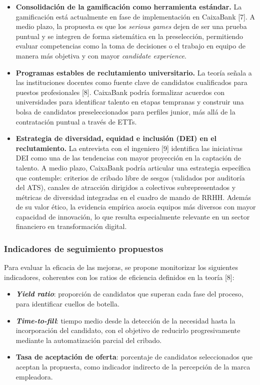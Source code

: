 \begin{itemize}
  \item \textbf{Consolidación de la gamificación como herramienta estándar.}
        La gamificación está actualmente en fase de implementación en CaixaBank [7].
        A medio plazo, la propuesta es que los \textit{serious games} dejen de ser
        una prueba puntual y se integren de forma sistemática en la preselección,
        permitiendo evaluar competencias como la toma de decisiones o el trabajo en
        equipo de manera más objetiva y con mayor \textit{candidate experience}.

  \item \textbf{Programas estables de reclutamiento universitario.}
        La teoría señala a las instituciones docentes como fuente clave de candidatos
        cualificados para puestos profesionales [8]. CaixaBank podría formalizar
        acuerdos con universidades para identificar talento en etapas tempranas y
        construir una bolsa de candidatos preseleccionados para perfiles junior, más
        allá de la contratación puntual a través de ETTs.

  \item \textbf{Estrategia de diversidad, equidad e inclusión (DEI) en el
        reclutamiento.} La entrevista con el ingeniero [9] identifica las iniciativas DEI
        como una de las tendencias con mayor proyección en la captación de talento.
        A medio plazo, CaixaBank podría articular una estrategia específica que
        contemple: criterios de cribado libre de sesgos (validados por auditoría del
        ATS), canales de atracción dirigidos a colectivos subrepresentados y métricas
        de diversidad integradas en el cuadro de mando de RRHH. Además de su valor
        ético, la evidencia empírica asocia equipos más diversos con mayor capacidad
        de innovación, lo que resulta especialmente relevante en un sector financiero
        en transformación digital.
\end{itemize}

\subsubsection{Indicadores de seguimiento propuestos}

Para evaluar la eficacia de las mejoras, se propone monitorizar los siguientes
indicadores, coherentes con los ratios de eficiencia definidos en la teoría [8]:

\begin{itemize}
  \item \textbf{\textit{Yield ratio}}: proporción de candidatos que superan cada
        fase del proceso, para identificar cuellos de botella.
  \item \textbf{\textit{Time-to-fill}}: tiempo medio desde la detección de la
        necesidad hasta la incorporación del candidato, con el objetivo de reducirlo
        progresivamente mediante la automatización parcial del cribado.
  \item \textbf{Tasa de aceptación de oferta}: porcentaje de candidatos seleccionados
        que aceptan la propuesta, como indicador indirecto de la percepción de la
        marca empleadora.
\end{itemize}

